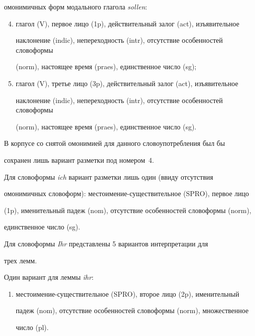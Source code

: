 омонимичных форм модального глагола \textit{sollen}:


  \begin{enumerate}[(1)]


  \setcounter{enumi}{3}


\item глагол (V), первое лицо (1p), действительный залог (act), изъявительное 


наклонение (indic), непереходность (intr), отсутствие особенностей словоформы 


(norm), настоящее время (praes), единственное число (sg);


\item глагол (V), третье лицо (3p), действительный залог (act), изъявительное 


наклонение (indic), непереходность (intr), отсутствие особенностей словоформы 


(norm), настоящее время (praes), единственное число (sg).


\end{enumerate}





  В корпусе со снятой омонимией для данного словоупотребления был бы 


сохранен лишь вариант разметки под номером~4.


  


  Для словоформы \textit{ich} вариант разметки лишь один (ввиду отсутствия 


омонимичных словоформ): местоимение-существительное (SPRO), первое лицо 


(1p), именительный падеж (nom), отсутствие особенностей словоформы (norm), 


единственное число (sg).


  


  Для словоформы \textit{Ihr} представлены 5 вариантов интерпретации для 


трех лемм.


  


  Один вариант для леммы \textit{ihr}:


  \begin{enumerate}[(1)]


\item местоимение-существительное (SPRO), второе лицо (2p), именительный 


падеж (nom), отсутствие особенностей словоформы (norm), множественное 


число (pl).


\end{enumerate}





